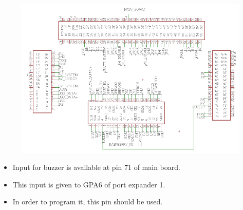 \documentclass[a4paper,12pt,oneside]{book}
\begin{document}
\section*{\textbf{\fontsize{25}{10}\selectfont{5.Buzzer interface}}}
\begin{figure}[h]
	
	\includegraphics[width=1\textwidth]{buzzer}
\end{figure}
\hfill
\begin{itemize}
	\item {Input for buzzer is available at pin 71 of main board.}
	\item {This input is given to GPA6 of port expander 1.}
	\item {In order to program it, this pin should be used.}
\end{itemize}
\pagebreak
\end{document}
